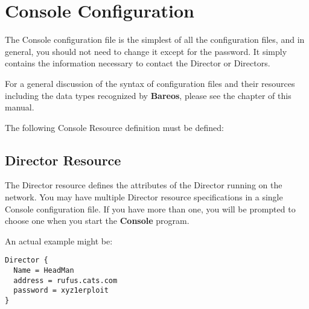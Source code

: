 
\chapter{Console Configuration}
\label{ConsoleConfChapter}

The Console configuration file is the simplest of all the configuration files,
and in general, you should not need to change it except for the password. It
simply contains the information necessary to contact the Director or
Directors.

For a general discussion of the syntax of configuration files and their
resources including the data types recognized by {\bf Bareos}, please see
the  chapter of this manual.

The following Console Resource definition must be defined:

\section{Director Resource}
\label{ConsoleResourceDirector}

The Director resource defines the attributes of the Director running on the
network. You may have multiple Director resource specifications in a single
Console configuration file. If you have more than one, you will be prompted to
choose one when you start the {\bf Console} program.





An actual example might be:

\footnotesize
\begin{verbatim}
Director {
  Name = HeadMan
  address = rufus.cats.com
  password = xyz1erploit
}
\end{verbatim}
\normalsize

